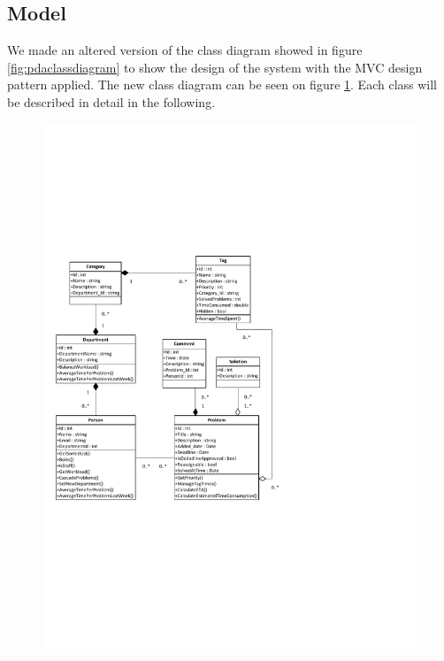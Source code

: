 \subsection{Model}
\label{sub:modelComponent}
We made an altered version of the class diagram showed in figure \ref{fig:pdaclassdiagram} to show the design of the system with the MVC design pattern applied. The new class diagram can be seen on figure \ref{fig:ClassDiagramV2}.
Each class will be described in detail in the following.
\begin{figure}[p]%
\includegraphics[clip=true, width=1.00\textwidth, trim=0.5cm 5cm 8cm 7cm]{input/component_design/ClassDiagramV2.pdf}%
%
\label{fig:ClassDiagramV2}%
\end{figure}

